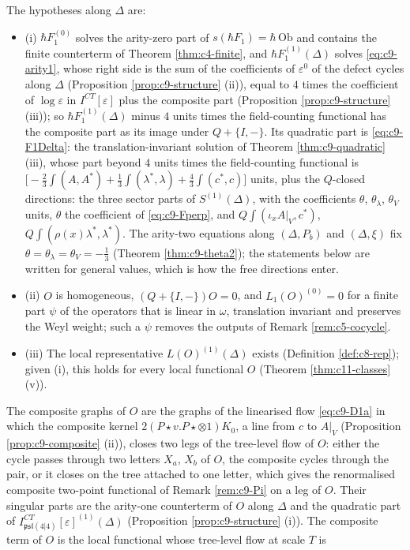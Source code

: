 \begin{definition}
\label{def:c10-hyp}
The hypotheses along $\Delta$ are:
\begin{itemize}
\item (i) $\hbar F_1^{(0)}$ solves the arity-zero part of $s(\hbar F_1)=\hbar\,\mathrm{Ob}$ and contains the finite counterterm of Theorem \ref{thm:c4-finite}, and $\hbar F_1^{(1)}(\Delta)$ solves \eqref{eq:c9-arity1}, whose right side is the sum of the coefficients of $\varepsilon^0$ of the defect cycles along $\Delta$ (Proposition \ref{prop:c9-structure} (ii)), equal to $4$ times the coefficient of $\log\varepsilon$ in $I^{CT}[\varepsilon]$ plus the composite part (Proposition \ref{prop:c9-structure} (iii)); so $\hbar F_1^{(1)}(\Delta)$ minus $4$ units times the field-counting functional has the composite part as its image under $Q+\{I,-\}$. Its quadratic part is \eqref{eq:c9-F1Delta}: the translation-invariant solution of Theorem \ref{thm:c9-quadratic} (iii), whose part beyond $4$ units times the field-counting functional is $\big[-\tfrac23\int(A,A^*)+\tfrac13\int(\lambda^*,\lambda)+\tfrac43\int(c^*,c)\big]$ units, plus the $Q$-closed directions: the three sector parts of $S^{(1)}(\Delta)$, with the coefficients $\theta$, $\theta_\lambda$, $\theta_V$ units, $\theta$ the coefficient of \eqref{eq:c9-Fperp}, and $Q\int(\iota_xA|_V,c^*)$, $Q\int(\rho(x)\lambda^*,\lambda^*)$. The arity-two equations along $(\Delta,P_b)$ and $(\Delta,\xi)$ fix $\theta=\theta_\lambda=\theta_V=-\tfrac13$ (Theorem \ref{thm:c9-theta2}); the statements below are written for general values, which is how the free directions enter.
\item (ii) $O$ is homogeneous, $(Q+\{I,-\})O=0$, and $L_1(O)^{(0)}=0$ for a finite part $\psi$ of the operators that is linear in $\omega$, translation invariant and preserves the Weyl weight; such a $\psi$ removes the outputs of Remark \ref{rem:c5-cocycle}.
\item (iii) The local representative $L(O)^{(1)}(\Delta)$ exists (Definition \ref{def:c8-rep}); given (i), this holds for every local functional $O$ (Theorem \ref{thm:c11-classes} (v)).
\end{itemize}
The composite graphs of $O$ are the graphs of the linearised flow \eqref{eq:c9-D1a} in which the composite kernel $2(P\star v.P\star\otimes1)K_0$, a line from $c$ to $A|_V$ (Proposition \ref{prop:c9-composite} (ii)), closes two legs of the tree-level flow of $O$: either the cycle passes through two letters $X_a$, $X_b$ of $O$, the composite cycles through the pair, or it closes on the tree attached to one letter, which gives the renormalised composite two-point functional of Remark \ref{rem:c9-Pi} on a leg of $O$. Their singular parts are the arity-one counterterm of $O$ along $\Delta$ and the quadratic part of $I^{CT}_{\mathfrak{psl}(4|4)}[\varepsilon]^{(1)}(\Delta)$ (Proposition \ref{prop:c9-structure} (i)). The composite term of $O$ is the local functional whose tree-level flow at scale $T$ is

\end{definition}
